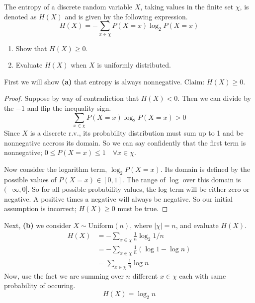\documentclass{article}
\begin{document}
    \nextproblem
    \nextproblem
    \begin{problem}
        The entropy of a discrete random variable $X$, taking values in the finite set $\chi$, is denoted as $H(X)$ and is given by the following expression.
        \begin{equation*}
            H(X) = -\sum_{x \in \chi} P(X = x) \log_2 P(X = x)
        \end{equation*}
        \begin{enumerate}[label=(\alph*)]
            \item Show that $H(X) \geq 0$.
            \item Evaluate $H(X)$ when $X$ is uniformly distributed.
        \end{enumerate}
    \end{problem}

    \begin{solution}
        First we will show \textbf{(a)} that entropy is always nonnegative. Claim: $H(X) \geq 0$.
        \begin{proof}
            Suppose by way of contradiction that $H(X) < 0$. Then we can divide by the $-1$ and flip the inequality sign.
            \begin{equation*}
                \sum_{x \in \chi} P(X = x) \log_2 P(X = x) > 0
            \end{equation*}
            Since $X$ is a discrete r.v., its probability distribution must sum up to 1 and be nonnegative accross its domain. So we can say confidently that the first term is nonnegative; $0 \leq P(X = x) \leq 1 \quad \forall x \in \chi$. 
            
            Now consider the logarithm term, $\log_2 P(X = x)$. Its domain is defined by the possible values of $P(X = x) \in [0,1]$. The range of $\log$ over this domain is $(-\infty, 0]$. So for all possible probability values, the log term will be either zero or negative. A positive times a negative will always be negative. So our initial assumption is incorrect; $H(X) \geq 0$ must be true.
        \end{proof}

        Next, \textbf{(b)} we consider $X \sim \mathrm{Uniform}(n)$, where $|\chi| = n$, and evaluate $H(X)$.
        \begin{align*}
            H(X) &= -\sum_{x \in \chi} \frac{1}{n} \log_2{1/n} \\
                 &= -\sum_{x \in \chi} \frac{1}{n} (\log{1} - \log{n}) \\
                 &= \sum_{x \in \chi} \frac{1}{n} \log{n}
        \end{align*}
        Now, use the fact we are summing over $n$ different $x \in \chi$ each with same probability of occuring.
        \begin{equation}
            H(X) = \log_2{n}
        \end{equation}
    \end{solution}
\end{document}
